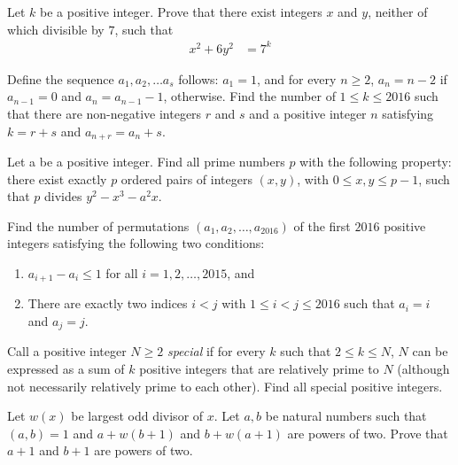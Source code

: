 \begin{problem}
	Let $k$ be a positive integer. Prove that there exist integers $x$ and $y$, neither of which divisible by $7$, such that
		\begin{align*}
			x^2 + 6y^2
				& = 7^k
		\end{align*}
\end{problem}

\begin{problem}
	Define the sequence $a_1, a_2,\dots a_s$ follows: $a_1 = 1$, and for every $n \geq 2$, $a_n = n - 2$ if $a_{n-1} = 0$ and $a_n = a_{n-1} - 1$, otherwise. Find the number of $1 \leq k \leq 2016$ such that there are non-negative integers $r$ and $s$ and a positive integer $n$ satisfying $k = r + s$ and $a_{n+r} = a_n + s.$
\end{problem}

\begin{problem}
	Let a be a positive integer. Find all prime numbers $p$ with the following property: there exist exactly $p$ ordered pairs of integers $(x, y)$, with $0 \leq x, y \leq p - 1$, such that $p$ divides $y^2 - x^3 - a^2x$.
\end{problem}

\begin{problem}
	Find the number of permutations $(a_1, a_2, \dots, a_{2016})$ of the first $2016$ positive integers satisfying the following two conditions:
	\begin{enumerate}
		\item $a_{i+1} - a_i \leq 1$ for all $i =1 , 2, \dots, 2015$, and
		\item There are exactly two indices $i < j$ with $1 \leq i < j \leq 2016$ such that $a_i = i$ and $a_j = j$.
	\end{enumerate}
\end{problem}

\begin{problem}
	Call a positive integer $N \geq 2$ \textit{special} if for every $k$ such that $2 \leq k \leq N$, $N$ can be expressed as a sum of $k$ positive integers that are relatively prime to $N$ (although not necessarily relatively prime to each other). Find all special positive integers.
\end{problem}

\begin{problem}
	Let $w(x)$ be largest odd divisor of $x$. Let $a,b$ be natural numbers such that $(a,b)=1$ and $a+w(b+1)$ and $b+w(a+1)$ are powers of two. Prove that $a+1$ and $b+1$ are powers of two. %
\end{problem}

